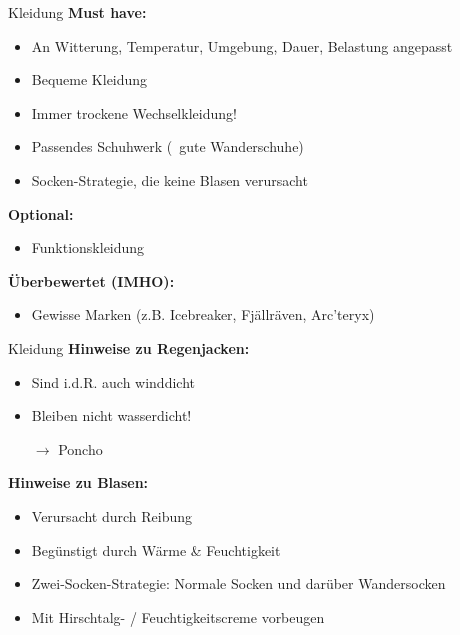 \documentclass[aspectratio=169]{beamer}
\newcommand{\sarrow}{\small$\rightarrow$}
\begin{document}
			\begin{frame}{Kleidung}
				\textbf{Must have:}
				\begin{itemize}
					\item An Witterung, Temperatur, Umgebung, Dauer, Belastung angepasst
					\item Bequeme Kleidung
					\item Immer trockene Wechselkleidung!
					\item Passendes Schuhwerk (\textrightarrow\ gute Wanderschuhe)
					\item Socken-Strategie, die keine Blasen verursacht
				\end{itemize}\pause
				\textbf{Optional:}
				\begin{itemize}
					\item Funktionskleidung
				\end{itemize}\pause
				\textbf{Überbewertet (IMHO):}
				\begin{itemize}
					\item Gewisse Marken (z.B. Icebreaker, Fjällräven, Arc'teryx)
				\end{itemize}
			\end{frame}
			
			\begin{frame}{Kleidung}
				\textbf{Hinweise zu Regenjacken:}
				\begin{itemize}
					\item Sind i.d.R. auch winddicht
					\item Bleiben nicht wasserdicht!
					\item[\sarrow] Poncho
				\end{itemize}
				\pause
				\vspace{0.2cm}
				\textbf{Hinweise zu Blasen:}
				\begin{itemize}
					\item Verursacht durch Reibung
					\item Begünstigt durch Wärme \& Feuchtigkeit
					\item Zwei-Socken-Strategie: Normale Socken und darüber Wandersocken
					\item Mit Hirschtalg- / Feuchtigkeitscreme vorbeugen
				\end{itemize}
			\end{frame}
			
\end{document}
